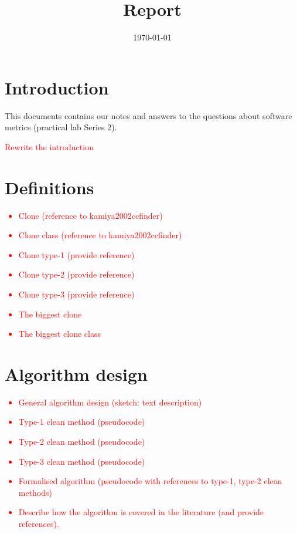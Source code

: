 \documentclass{uva-inf-article}
\title{Report}
\date{\today}
\newcommand\todo[1]{\textcolor{red}{#1}}
\begin{document}
\maketitle




\section{Introduction}

This documents contains our notes and answers to the questions about software metrics (practical lab Series 2).

\todo{Rewrite the introduction}

\section{Definitions}

\todo {
	\begin{itemize}
		\item{Clone (reference to kamiya2002ccfinder)}
		\item{Clone class (reference to kamiya2002ccfinder)}
		\item{Clone type-1 (provide reference)}
		\item{Clone type-2 (provide reference) }
		\item{Clone type-3 (provide reference) }
		\item{The biggest clone }
		\item{The biggest clone class}
	\end{itemize}
}

\section{Algorithm design}

\todo {
	\begin{itemize}
		\item{General algorithm design (sketch: text description) }
		\item{Type-1 clean method (pseudocode)}
		\item{Type-2 clean method (pseudocode) }
		\item{Type-3 clean method (pseudocode) }
		\item{Formalised algorithm (pseudocode with references to type-1, type-2 clean methods)}
		\item{Describe how the algorithm is covered in the literature (and provide references).}
	\end{itemize}
}
\end{document}
